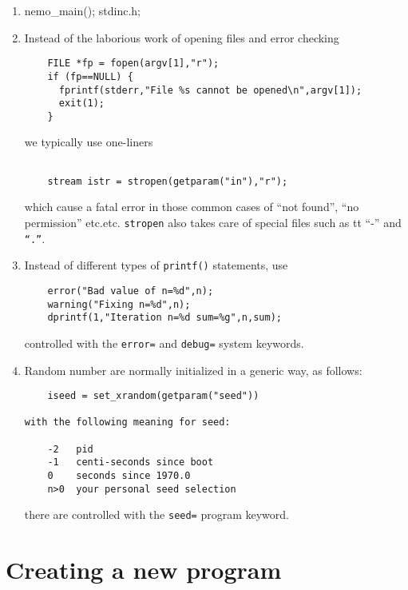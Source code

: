 \begin{itemize}
\begin{itemize}
\begin{enumerate}

\item
nemo\_main(); stdinc.h;

\item
Instead of the laborious work of opening files and error checking

\footnotesize\begin{verbatim}
    FILE *fp = fopen(argv[1],"r");
    if (fp==NULL) {
      fprintf(stderr,"File %s cannot be opened\n",argv[1]);
      exit(1);
    }
\end{verbatim}\normalsize

we typically use one-liners
\footnotesize\begin{verbatim}

    stream istr = stropen(getparam("in"),"r");
\end{verbatim}\normalsize
which cause a fatal error 
in those common cases of ``not found'', ``no permission'' etc.etc.
{\tt stropen} also takes care of special files such as {tt ``-''} and {\tt ``.''}.

\item
Instead of different types of {\tt printf()} statements, use
\footnotesize\begin{verbatim}
    error("Bad value of n=%d",n);
    warning("Fixing n=%d",n);
    dprintf(1,"Iteration n=%d sum=%g",n,sum);
\end{verbatim}\normalsize
controlled with the {\tt error=} and {\tt debug=} system keywords.

\item
Random number are normally initialized in a generic way, as follows:
\footnotesize\begin{verbatim}
    iseed = set_xrandom(getparam("seed"))

with the following meaning for seed:

    -2   pid
    -1   centi-seconds since boot
    0    seconds since 1970.0
    n>0  your personal seed selection
\end{verbatim}\normalsize

there are controlled with the  {\tt seed=} program keyword.


\end{enumerate}

\section{Creating a new program}


\end{itemize}
\end{itemize}
